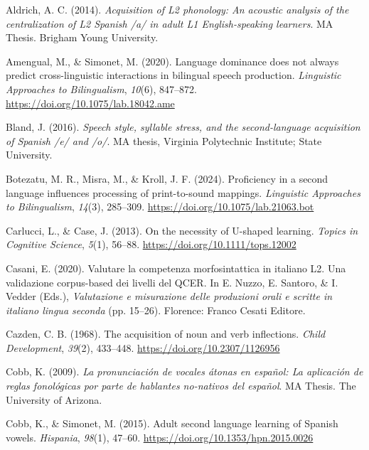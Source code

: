 \documentclass[
  letterpaper,
  DIV=11,
  numbers=noendperiod]{scrartcl}
\newlength{\cslhangindent}
\newenvironment{CSLReferences}[2] %
 {\begin{list}{}{%
  \setlength{\itemindent}{0pt}
  \setlength{\leftmargin}{0pt}
  \setlength{\parsep}{0pt}
  \ifodd #1
   \setlength{\leftmargin}{\cslhangindent}
   \setlength{\itemindent}{-1\cslhangindent}
  \fi
  \setlength{\itemsep}{#2\baselineskip}}}
 {\end{list}}
\begin{document}
\label{refs}
\begin{CSLReferences}{1}{0}
Aldrich, A. C. (2014). \emph{Acquisition of {L}2 phonology: An acoustic
analysis of the centralization of {L}2 {S}panish /a/ in adult {L}1
{E}nglish-speaking learners}. MA Thesis. Brigham Young University.

Amengual, M., \& Simonet, M. (2020). Language dominance does not always
predict cross-linguistic interactions in bilingual speech production.
\emph{Linguistic Approaches to Bilingualism}, \emph{10}(6), 847--872.
\url{https://doi.org/10.1075/lab.18042.ame}

Bland, J. (2016). \emph{Speech style, syllable stress, and the
second-language acquisition of {S}panish /e/ and /o/}. MA thesis,
Virginia Polytechnic Institute; State University.

Botezatu, M. R., Misra, M., \& Kroll, J. F. (2024). Proficiency in a
second language influences processing of print-to-sound mappings.
\emph{Linguistic Approaches to Bilingualism}, \emph{14}(3), 285--309.
\url{https://doi.org/10.1075/lab.21063.bot}

Carlucci, L., \& Case, J. (2013). On the necessity of {U}-shaped
learning. \emph{Topics in Cognitive Science}, \emph{5}(1), 56--88.
\url{https://doi.org/10.1111/tops.12002}

Casani, E. (2020). Valutare la competenza morfosintattica in italiano
{L}2. Una validazione corpus-based dei livelli del {QCER}. In E. Nuzzo,
E. Santoro, \& I. Vedder (Eds.), \emph{Valutazione e misurazione delle
produzioni orali e scritte in italiano lingua seconda} (pp. 15--26).
Florence: Franco Cesati Editore.

Cazden, C. B. (1968). The acquisition of noun and verb inflections.
\emph{Child Development}, \emph{39}(2), 433--448.
\url{https://doi.org/10.2307/1126956}

Cobb, K. (2009). \emph{La pronunciaci{ó}n de vocales {á}tonas en
espa{ñ}ol: La aplicaci{ó}n de reglas fonol{ó}gicas por parte de
hablantes no-nativos del espa{ñ}ol}. MA Thesis. The University of
Arizona.

Cobb, K., \& Simonet, M. (2015). Adult second language learning of
{S}panish vowels. \emph{Hispania}, \emph{98}(1), 47--60.
\url{https://doi.org/10.1353/hpn.2015.0026}


\end{CSLReferences}
\end{document}
